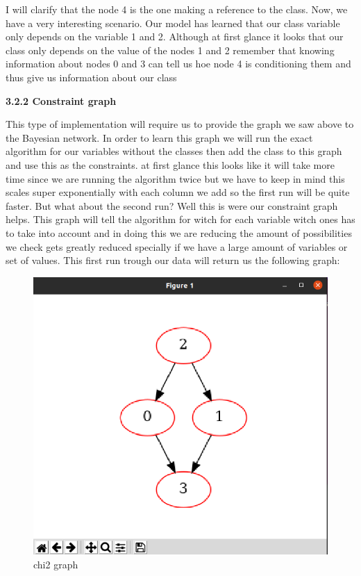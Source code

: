 \documentclass{article} %
\begin{document}
\bigskip
I will clarify that the node 4 is the one making a reference to the class. Now, we have a very interesting scenario. Our model has learned that our class variable only depends on the variable 1 and 2. Although at first glance it looks that our class only depends on the value of the nodes 1 and 2 remember that knowing information about nodes 0 and 3 can tell us hoe node 4 is conditioning them and thus give us information about our class
\bigskip
\begin{normalsize}
\textbf{3.2.2   Constraint graph} 
\end{normalsize}
This type of implementation will require us to provide the graph we saw above to the Bayesian network. In order to learn this graph we will run the exact algorithm for our variables without the classes then add the class to this graph and use this as the constraints.
\bigskip
at first glance this looks like it will take more time since we are running the algorithm twice but we have to keep in mind this scales super exponentially with each column we add so the first run will be quite faster. But what about the second run? Well this is were our constraint graph helps. This graph will tell the algorithm for witch for each variable witch ones has to take into account and in doing this we are reducing the amount of possibilities we check gets greatly reduced specially if we have a large amount of variables or set of values.
This first run trough our data will return us the following graph:
\bigskip
\begin{figure}[h!]
  \includegraphics[width=\linewidth]{chi2-var.png}
  \caption{chi2 graph}
  \label{fig:basic graph}
\end{figure}
\end{document}
